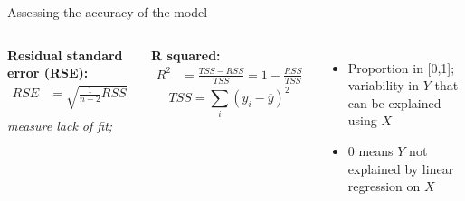 \documentclass[aspectratio=169,usenames,dvipsnames]{beamer}
\newcommand{\InstructorNotes}[1]{\textit{\color{orange}#1}}
\newcommand{\InstructorList}[1]{
\begin{itemize}
	\color{orange}
	#1
\end{itemize}
}
\begin{document}
\begin{frame}[c]{Assessing the accuracy of the model}
	\centering
\begin{columns}
\textbf{Residual standard error (RSE):}
\begin{align*}
	RSE &= \sqrt{ \frac{1}{n-2} RSS}\\
\end{align*}
\InstructorNotes{measure lack of fit; }




\textbf{R squared:}
\begin{align*}
	R^2 &= \frac{TSS-RSS}{TSS} = 1-\frac{RSS}{TSS}
\end{align*}
\begin{equation*}
	TSS = \sum_i (y_i - \overline y)^2
\end{equation*}
\InstructorList{
\item Proportion in [0,1]; variability in $Y$ that can be explained using $X$
\item 0 means $Y$ not explained by linear regression on $X$}
\end{columns}

\end{frame}




\end{document}
